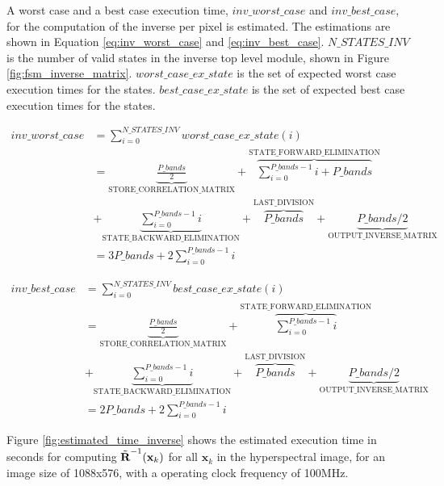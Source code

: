 A worst case and a best case execution time, $inv\_worst\_case$ and $inv\_best\_case$, for the computation of the inverse per pixel is estimated. The estimations are shown in Equation \ref{eq:inv_worst_case} and \ref{eq:inv_best_case}. $N\_STATES\_INV$ is the number of valid states in the inverse top level module, shown in Figure \ref{fig:fsm_inverse_matrix}. $worst\_case\_ex\_state$ is the set of expected worst case execution times for the states.  $best\_case\_ex\_state$ is the set of expected best case execution times for the states. 

\begin{equation}
\begin{split}
inv\_worst\_case & = \sum_{i=0}^{N\_STATES\_INV}worst\_case\_ex\_state(i) \\
& =\underbrace{\frac{P\_bands}{2} }_\text{STORE\_CORRELATION\_MATRIX}  + \overbrace{\sum_{i=0}^{P\_bands-1}i + P\_bands}^\text{STATE\_FORWARD\_ELIMINATION} \\
& + \underbrace{\sum_{i=0}^{P\_bands-1}i}_\text{STATE\_BACKWARD\_ELIMINATION}  
 +
\overbrace{P\_bands}^\text{LAST\_DIVISION} + \underbrace{P\_bands/2}_\text{OUTPUT\_INVERSE\_MATRIX}\\
& = 3P\_bands + 2\sum_{i=0}^{P\_bands-1}i
\end{split}
\label{eq:inv_worst_case}
\end{equation}


\begin{equation}
\begin{split}
inv\_best\_case & = \sum_{i=0}^{N\_STATES\_INV}best\_case\_ex\_state(i) \\
& = \underbrace{\frac{P\_bands}{2} }_\text{STORE\_CORRELATION\_MATRIX}  + \overbrace{\sum_{i=0}^{P\_bands-1}i }^\text{STATE\_FORWARD\_ELIMINATION} \\
& + \underbrace{\sum_{i=0}^{P\_bands-1}i}_\text{STATE\_BACKWARD\_ELIMINATION}  
 +
\overbrace{P\_bands}^\text{LAST\_DIVISION} + \underbrace{P\_bands/2}_\text{OUTPUT\_INVERSE\_MATRIX}\\
& = 2P\_bands + 2\sum_{i=0}^{P\_bands-1}i
\end{split}
\label{eq:inv_best_case}
\end{equation}

Figure \ref{fig:estimated_time_inverse} shows the estimated execution time in seconds for computing $\Tilde{\textbf{R}}^{-1}(\textbf{x}_k)$ for all $\textbf{x}_k$ in the hyperspectral image, for an image size of 1088x576, with a operating clock frequency of 100MHz. 

